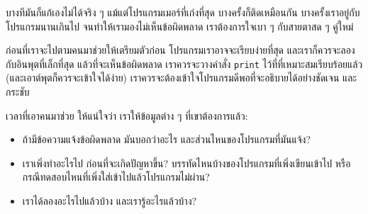 
บางทีมันก็แก้เองไม่ได้จริง ๆ
แม้แต่โปรแกรมเมอร์ที่เก่งที่สุด บางครั้งก็ติดเหมือนกัน
บางครั้งเราอยู่กับโปรแกรมนานเกินไป
จนทำให้เรามองไม่เห็นข้อผิดพลาด
เราต้องการใจเบา ๆ กับสายตาสด ๆ คู่ใหม่


ก่อนที่เราจะไปตามคนมาช่วยให้เตรียมตัวก่อน
โปรแกรมเราอาจจะเรียบง่ายที่สุด
และเราก็ควรจะลองกับอินพุตที่เล็กที่สุด แล้วที่จะเห็นข้อผิดพลาด
เราควรจะวางคำสั่ง \texttt{print} ไว้ที่ที่เหมาะสมเรียบร้อยแล้ว (และเอาต์พุตก็ควรจะเข้าใจได้ง่าย)
เราควรจะต้องเข้าใจโปรแกรมดีพอที่จะอธิบายได้อย่างชัดเจน และกระชับ


เวลาที่เอาคนมาช่วย
ให้แน่ใจว่า เราให้ข้อมูลต่าง ๆ ที่เขาต้องการแล้ว:

\begin{itemize}

\item ถ้ามีข้อความแจ้งข้อผิดพลาด
มันบอกว่าอะไร
และส่วนไหนของโปรแกรมที่มันแจ้ง?


\item เราเพิ่งทำอะไรไป ก่อนที่จะเกิดปัญหาขึ้น?
บรรทัดไหนบ้างของโปรแกรมที่เพิ่งเขียนเข้าไป
หรือกรณีทดสอบไหนที่เพิ่งใส่เข้าไปแล้วโปรแกรมไม่ผ่าน?

\item เราได้ลองอะไรไปแล้วบ้าง และเรารู้อะไรแล้วบ้าง?


\end{itemize}

